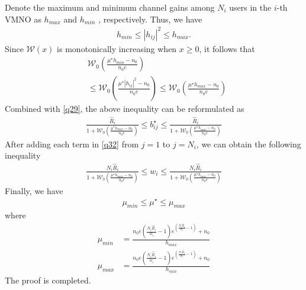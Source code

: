 \documentclass[journal]{IEEEtran}
\begin{document}
Denote the maximum and minimum channel gains among $N_i$ users in the $i$-th VMNO as $h_{max}$ and $h_{min}$  , respectively. Thus, we have
\begin{align}
h_{min} \leq \left|h_{ij}\right|^2 \leq h_{max}.
\end{align}
Since $\mathcal{W}\left(x\right)$ is monotonically increasing when $x \geq 0$, it follows that
\begin{align}
&\mathcal{W}_0\left(\frac{\mu^\star h_{min} - n_0}{n_0e}\right) \nonumber \\ & \leq  \mathcal{W}_0 \left(\frac{\mu^\star\left|h_{ij}\right|^2 - n_0}{n_0e}\right) \leq  \mathcal{W}_0\left(\frac{\mu^\star h_{max} - n_0}{n_0e}\right)
\end{align}
Combined with \eqref{q29}, the above inequality can be reformulated as
\begin{align}
\frac{\hat{R}_i}{1 + \mathcal{W}_0\left(\frac{\mu^\star h_{max} - n_0}{n_0e}\right)} \leq b_{ij}^\star \leq \frac{\hat{R}_i}{1 + \mathcal{W}_0\left(\frac{\mu^\star h_{min} - n_0}{n_0e}\right)} \label{q32}
\end{align}
After adding each term in \eqref{q32} from $j = 1$ to $j = N_i$, we can obtain the following inequality
\begin{align}
\frac{N_i\hat{R}_i}{1 + \mathcal{W}_0\left(\frac{\mu^\star h_{max} - n_0}{n_0e}\right)} \leq w_{i} \leq \frac{N_i\hat{R}_i}{1 + \mathcal{W}_0\left(\frac{\mu^\star h_{min} - n_0}{n_0e}\right)} 
\end{align}
Finally, we have
\begin{align}
\mu_{min} \leq \mu^\star \leq \mu_{max}
\end{align}
where 
\begin{align}
\mu_{min} &= \frac{n_0e\left(\frac{N_i\hat{R}_i}{w_i} - 1\right)e^{\left(\frac{N_i\hat{R}_i}{w_i} - 1\right)} + n_0}{h_{max}}  \\
\mu_{max} & = \frac{n_0e\left(\frac{N_i\hat{R}_i}{w_i} - 1\right)e^{\left(\frac{N_i\hat{R}_i}{w_i} - 1\right)} + n_0}{h_{min}}
\end{align}
The proof is completed.
 
\end{document}
